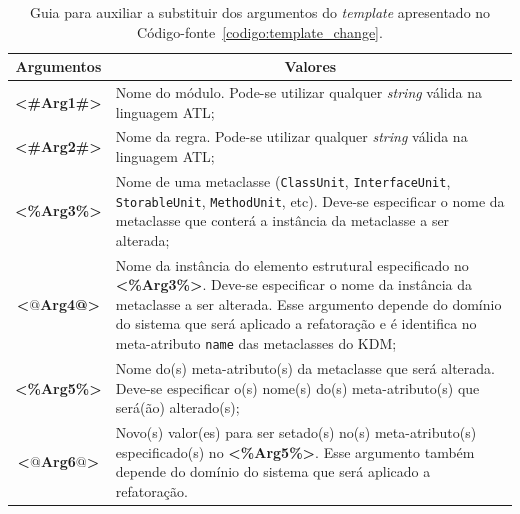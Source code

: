 \begin{table}[h]
\centering
\caption{Guia para auxiliar a substituir dos argumentos do \textit{template} apresentado no Código-fonte~\ref{codigo:template_change}.}
\label{tab:guia_template_operacao_change}
\begin{tabular}{ | m{1.7cm} | m{12cm}| } 
\hline
\multicolumn{1}{|c|}{Argumentos}                                         & \multicolumn{1}{c|}{Valores} \\ \hline
\multicolumn{1}{|c|}{\textbf{<\#Arg1\#>}} & Nome do módulo. Pode-se utilizar qualquer \textit{string} válida na linguagem ATL; \\ 
\hline
\multicolumn{1}{|c|}{\textbf{<\#Arg2\#>}} & Nome da regra. Pode-se utilizar qualquer \textit{string} válida na linguagem ATL; \\  
\hline
\multicolumn{1}{|c|}{\textbf{<\%Arg3\%>}} & Nome de uma metaclasse (\texttt{ClassUnit}, \texttt{InterfaceUnit}, \texttt{StorableUnit}, \texttt{MethodUnit}, etc). Deve-se especificar o nome da metaclasse que conterá a instância da metaclasse a ser alterada; \\ 
\hline
\multicolumn{1}{|c|}{\textbf{<$@$Arg4@>}} & Nome da instância do elemento estrutural especificado no \textbf{<\%Arg3\%>}. Deve-se especificar o nome da instância da metaclasse a ser alterada. Esse argumento depende do domínio do sistema que será aplicado a refatoração e é identifica no meta-atributo \texttt{name} das metaclasses do KDM;  \\ 
\hline
\multicolumn{1}{|c|}{\textbf{<\%Arg5\%>}} & Nome do(s) meta-atributo(s) da metaclasse que será alterada. Deve-se especificar o(s) nome(s) do(s) meta-atributo(s) que será(ão) alterado(s);  \\ 
\hline
\multicolumn{1}{|c|}{\textbf{<$@$Arg6$@$>}} & Novo(s) valor(es) para ser setado(s) no(s) meta-atributo(s) especificado(s) no \textbf{<\%Arg5\%>}. Esse argumento também depende do domínio do sistema que será aplicado a refatoração.  \\ 
\hline
\end{tabular}
\end{table}

